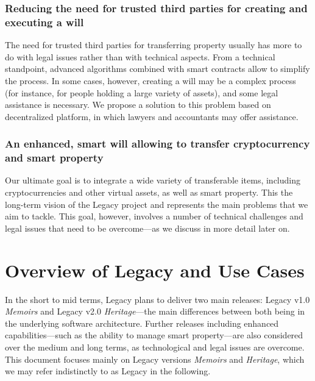 
\subsubsection*{Reducing the need for trusted third parties for creating and executing a will} %
\label{ssub:reducing_the_need_for_trusted_third_parties_for_creating_and_executing_a_will}
The need for trusted third parties for transferring property usually has more to do with legal issues rather than with technical aspects. From a technical standpoint, advanced algorithms combined with smart contracts allow to simplify the process. In some cases, however, creating a will may be a complex process (for instance, for people holding a large variety of assets), and some legal assistance is necessary. We propose a solution to this problem based on decentralized platform, in which lawyers and accountants may offer assistance.

\subsubsection*{An enhanced, smart will allowing to transfer cryptocurrency and smart property} %
\label{ssub:_an_enhanced_smart_will_allowing_to_transfer_cryptocurrency_and_smart_property_}
Our ultimate goal is to integrate a wide variety of transferable items, including cryptocurrencies and other virtual assets, as well as smart property. This the long-term vision of the Legacy project and represents the main problems that we aim to tackle. This goal, however, involves a number of technical challenges and legal issues that need to be overcome---as we discuss in more detail later on.


\section{Overview of Legacy and Use Cases} %
\label{sec:overview_of_legacy_and_use_cases}
In the short to mid terms, Legacy plans to deliver two main releases: Legacy v1.0 \textit{Memoirs} and Legacy v2.0 \textit{Heritage}---the main differences between both being in the underlying software architecture. Further releases including enhanced capabilities---such as the ability to manage smart property---are also considered over the medium and long terms, as technological and legal issues are overcome. This document focuses mainly on Legacy versions \textit{Memoirs} and \textit{Heritage}, which we may refer indistinctly to as Legacy in the following. 


